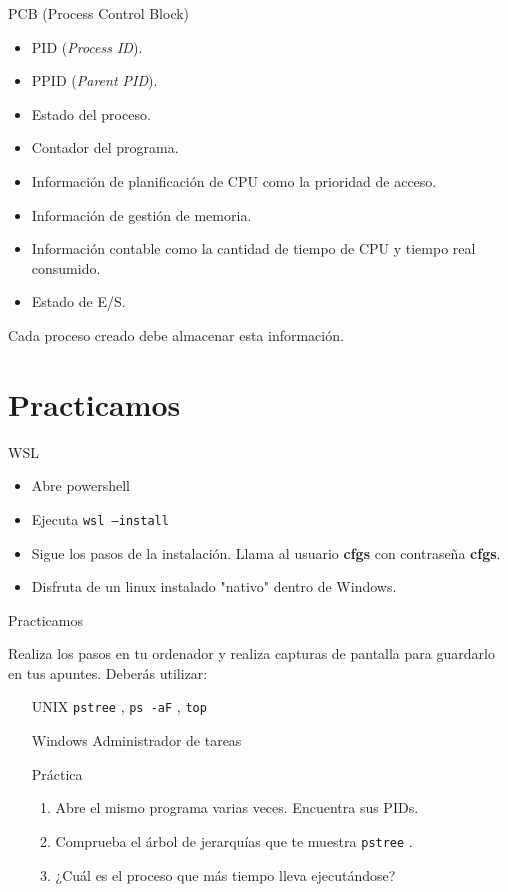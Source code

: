 \documentclass{beamer}
\newcommand{\code}[1]{%
  \colorbox{gray!10}{\texttt{#1}}%
}
\begin{document}
\begin{frame}{PCB (Process Control Block)}
        \begin{itemize}
            \item PID (\textit{Process ID}).
            \item PPID (\textit{Parent PID}).
            \item Estado del proceso.
            \item Contador del programa.
            \item Información de planificación de CPU como la prioridad de acceso.
            \item Información de gestión de memoria.
            \item Información contable como la cantidad de tiempo de CPU y tiempo real consumido.
            \item Estado de E/S.
        \end{itemize}
    Cada proceso creado debe almacenar esta información.
\end{frame}

\section{Practicamos}
\begin{frame}{WSL}
    \begin{itemize}
        \item Abre powershell
        \item Ejecuta \code{wsl --install}
        \item Sigue los pasos de la instalación. Llama al usuario \textbf{cfgs} con contraseña \textbf{cfgs}.
        \item Disfruta de un linux instalado "nativo" dentro de Windows.
    \end{itemize}
\end{frame}

\begin{frame}{Practicamos}

Realiza los pasos en tu ordenador y realiza capturas de pantalla para guardarlo en tus apuntes. Deberás utilizar:
\begin{itemize}
    \item[UNIX] \code{pstree}, \code{ps -aF}, \code{top}
    \item[Windows] Administrador de tareas
    \item[Práctica] \begin{enumerate}
        \item Abre el mismo programa varias veces. Encuentra sus PIDs.
        \item Comprueba el árbol de jerarquías que te muestra \code{pstree}.
        \item ¿Cuál es el proceso que más tiempo lleva ejecutándose?
    \end{enumerate}
\end{itemize}



\end{frame}
\end{document}
